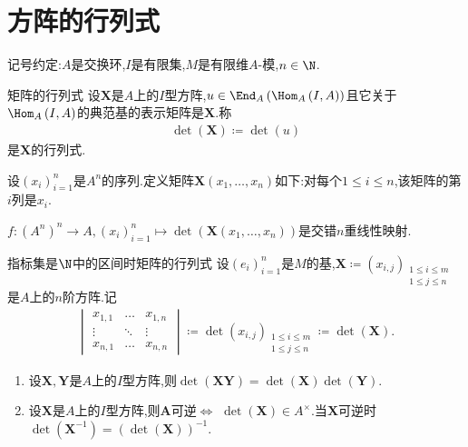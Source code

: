 \section{方阵的行列式}

记号约定:$A$是交换环,$I$是有限集,$M$是有限维$A$-模,$n\in\N$.

\begin{definition}{矩阵的行列式}{}
	设$\boldsymbol{X}$是$A$上的$I$型方阵,$u\in\End_{A}\left(\Hom_{A}\left(I,A\right)\right)$且它关于$\Hom_{A}\left(I,A\right)$的典范基的表示矩阵是$\boldsymbol{X}$.称
	\begin{align*}
		\det\left(\boldsymbol{X}\right)\coloneq\det\left(u\right)
	\end{align*}
	是$\boldsymbol{X}$的行列式.
\end{definition}

\begin{definition}{}{}
	设$\left(x_{i}\right)_{i=1}^{n}$是$A^{n}$的序列.定义矩阵$\boldsymbol{X}\left(x_{1},\ldots,x_{n}\right)$如下:对每个$1\leq i\leq n$,该矩阵的第$i$列是$x_{i}$.
\end{definition}

\begin{proposition}{}{}
	$f:\left(A^{n}\right)^{n}\to A,\left(x_{i}\right)_{i=1}^{n}\mapsto\det\left(\boldsymbol{X}\left(x_{1},\ldots,x_{n}\right)\right)$是交错$n$重线性映射.
\end{proposition}

\begin{definition}{指标集是$\N$中的区间时矩阵的行列式}{}
	设$\left(e_{i}\right)_{i=1}^{n}$是$M$的基,$\boldsymbol{X}\coloneq\left(x_{i,j}\right)_{\substack{1\leq i\leq m\\1\leq j\leq n}}$是$A$上的$n$阶方阵.记
	\begin{align*}
		\begin{vmatrix}
			x_{1,1}&\ldots&x_{1,n}\\
			\vdots&\ddots&\vdots\\
			x_{n,1}&\ldots&x_{n,n}
		\end{vmatrix}
		\coloneq\det\left(x_{i,j}\right)_{\substack{1\leq i\leq m\\1\leq j\leq n}}\coloneq\det\left(\boldsymbol{X}\right).
	\end{align*}
\end{definition}

\begin{proposition}{}{}
	\begin{enumerate}
		\item 设$\boldsymbol{X},\boldsymbol{Y}$是$A$上的$I$型方阵,则$\det\left(\boldsymbol{X}\boldsymbol{Y}\right)=\det\left(\boldsymbol{X}\right)\det\left(\boldsymbol{Y}\right)$.
		\item 设$\boldsymbol{X}$是$A$上的$I$型方阵,则$\boldsymbol{A}$可逆$\iff$ $\det\left(\boldsymbol{X}\right)\in A^{\times}$.当$\boldsymbol{X}$可逆时$\det\left(\boldsymbol{X}^{-1}\right)=\left(\det\left(\boldsymbol{X}\right)\right)^{-1}$.
	\end{enumerate}
\end{proposition}

